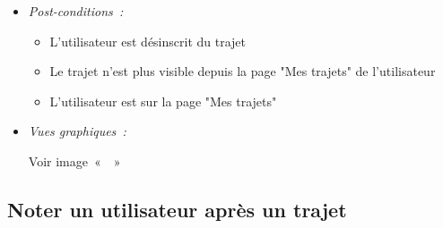 \begin{itemize}
\item \textit{Post-conditions~:}
\begin{itemize}
        \item L'utilisateur est désinscrit du trajet
        \item Le trajet n'est plus visible depuis la page "Mes trajets" de l'utilisateur
        \item L'utilisateur est sur la page "Mes trajets"
    \end{itemize}
    
    \item \textit{Vues graphiques~:}
    
    Voir image~«~~»

\end{itemize}


\subsection{Noter un utilisateur après un trajet}\label{subsec:noter-utilisateur-apres-trajet}


